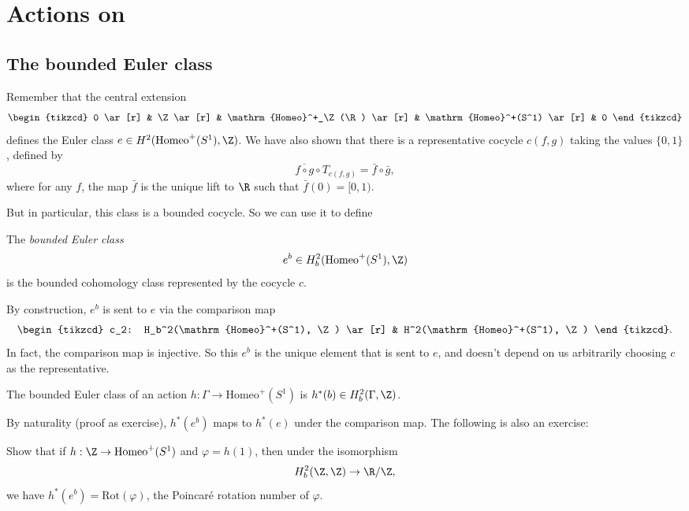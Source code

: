 \documentclass[a4paper]{article}
\newcommand\Homeo{\mathrm{Homeo}}
\newcommand\Rot{\mathrm{Rot}}
\begin{document}
\section{Actions on }
\subsection{The bounded Euler class}
Remember that the central extension
\[
  \begin{tikzcd}
    0 \ar[r] & \Z \ar[r] & \Homeo^+_\Z(\R) \ar[r] & \Homeo^+(S^1) \ar[r] & 0
  \end{tikzcd}
\]
defines the Euler class $e \in H^2(\Homeo^+(S^1), \Z)$. We have also shown that there is a representative cocycle $c(f, g)$ taking the values $\{0, 1\}$, defined by
\[
  \overline{f \circ g} \circ T_{c(f, g)} = \bar{f} \circ \bar{g},
\]
where for any $f$, the map $\bar{f}$ is the unique lift to $\R$ such that $\bar{f}(0) = [0, 1)$.

But in particular, this class is a bounded cocycle. So we can use it to define
\begin{defi}
  The \emph{bounded Euler class}
  \[
    e^b \in H_b^2(\Homeo^+(S^1), \Z)
  \]
  is the bounded cohomology class represented by the cocycle $c$.
\end{defi}

By construction, $e^b$ is sent to $e$ via the comparison map
\[
  \begin{tikzcd}
    c_2: H_b^2(\Homeo^+(S^1), \Z) \ar[r] & H^2(\Homeo^+(S^1), \Z)
  \end{tikzcd}.
\]
In fact, the comparison map is injective. So this $e^b$ is the unique element that is sent to $e$, and doesn't depend on us arbitrarily choosing $c$ as the representative.

\begin{defi}
  The bounded Euler class of an action $h: \Gamma \to \Homeo^+(S^1)$ is $h^*(b) \in H_b^2(\Gamma, \Z)$.
\end{defi}

By naturality (proof as exercise), $h^*(e^b)$ maps to $h^*(e)$ under the comparison map. The following is also an exercise:

\begin{ex}
  Show that if $h: \Z \to \Homeo^+(S^1)$ and $\varphi = h(1)$, then under the isomorphism
  \[
    H^2_b(\Z, \Z) \to \R/\Z,
  \]
  we have $h^*(e^b) = \Rot(\varphi)$, the Poincar\'e rotation number of $\varphi$.
\end{ex} %
\end{document}
